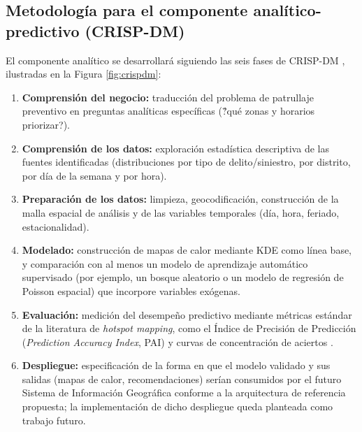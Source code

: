 \documentclass[12pt,letterpaper]{report}
\begin{document}
\subsection{Metodolog\'ia para el componente anal\'itico-predictivo (CRISP-DM)}
El componente anal\'itico se desarrollar\'a siguiendo las seis fases de CRISP-DM \citep{crispdm2000}, ilustradas en la Figura \ref{fig:crispdm}:
\begin{enumerate}
    \item \textbf{Comprensi\'on del negocio:} traducci\'on del problema de patrullaje preventivo en preguntas anal\'iticas espec\'ificas (\'?qu\'e zonas y horarios priorizar?).
    \item \textbf{Comprensi\'on de los datos:} exploraci\'on estad\'istica descriptiva de las fuentes identificadas (distribuciones por tipo de delito/siniestro, por distrito, por d\'ia de la semana y por hora).
    \item \textbf{Preparaci\'on de los datos:} limpieza, geocodificaci\'on, construcci\'on de la malla espacial de an\'alisis y de las variables temporales (d\'ia, hora, feriado, estacionalidad).
    \item \textbf{Modelado:} construcci\'on de mapas de calor mediante KDE \citep{silverman1986kde,chainey2008kde} como l\'inea base, y comparaci\'on con al menos un modelo de aprendizaje autom\'atico supervisado (por ejemplo, un bosque aleatorio o un modelo de regresi\'on de Poisson espacial) que incorpore variables ex\'ogenas.
    \item \textbf{Evaluaci\'on:} medici\'on del desempe\~no predictivo mediante m\'etricas est\'andar de la literatura de \textit{hotspot mapping}, como el \'Indice de Precisi\'on de Predicci\'on (\textit{Prediction Accuracy Index}, PAI) y curvas de concentraci\'on de aciertos \citep{chainey2008kde}.
    \item \textbf{Despliegue:} especificaci\'on de la forma en que el modelo validado y sus salidas (mapas de calor, recomendaciones) ser\'ian consumidos por el futuro Sistema de Informaci\'on Geogr\'afica conforme a la arquitectura de referencia propuesta; la implementaci\'on de dicho despliegue queda planteada como trabajo futuro.
\end{enumerate}
\end{document}
